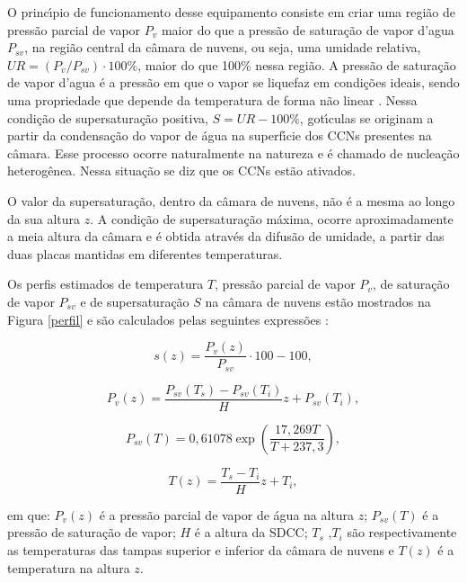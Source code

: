  O princ\'{\i}pio de funcionamento desse equipamento consiste em criar uma regi\~{a}o de press\~{a}o parcial de vapor $P_v$ maior do que a press\~{a}o de satura\c{c}\~{a}o de vapor d'agua $P_{sv}$, na regi\~{a}o central da c\^{a}mara de nuvens, ou seja, uma umidade relativa, $UR=(P_v/P_{sv}) \cdot 100\%$, maior do que 100\% nessa regi\~{a}o. A press\~{a}o de satura\c{c}\~{a}o de vapor d'agua \'{e} a press\~{a}o em que o vapor se liquefaz em condi\c{c}\~{o}es ideais, sendo uma propriedade que depende da temperatura de forma n\~{a}o linear \cite{wagner}. Nessa condi\c{c}\~{a}o de supersatura\c{c}\~{a}o positiva, $S=UR-100\%$, got\'{\i}culas se originam a partir da condensa\c{c}\~{a}o do vapor de \'{a}gua na superf\'{\i}cie dos CCNs presentes na c\^{a}mara. Esse processo ocorre naturalmente na natureza e \'{e} chamado de nuclea\c{c}\~{a}o heterog\^{e}nea. Nessa situa\c{c}\~{a}o se diz que os CCNs est\~{a}o ativados.

 O valor da supersatura\c{c}\~{a}o, dentro da c\^{a}mara de nuvens, n\~{a}o \'{e} a mesma ao longo da sua altura $z$. A condi\c{c}\~{a}o de supersatura\c{c}\~{a}o m\'{a}xima, ocorre aproximadamente a meia altura da c\^{a}mara e \'{e} obtida atrav\'{e}s da difus\~{a}o de umidade, a partir das duas placas mantidas em diferentes temperaturas.

Os perfis estimados de temperatura $T$, press\~{a}o parcial de vapor $P_v$, de satura\c{c}\~{a}o de vapor $P_{sv}$ e de supersatura\c{c}\~{a}o $S$ na c\^{a}mara de nuvens est\~{a}o mostrados na Figura \ref{perfil} e s\~{a}o calculados pelas seguintes express\~{o}es \cite{wagner,Frank}:


\begin{equation}
\label{eq01}
s(z)  = \frac{{P_v(z) }}{{P_{sv} }} \cdot 100 - 100,
\end{equation}

\begin{equation}
\label{eq02}
P_v(z)  = \frac{{P_{sv}(T_s )  - P_{sv}(T_i ) }}{H}z + P_{sv}(T_i ),
\end{equation}

\begin{equation}
\label{eq03}
P_{sv}(T)  = 0,61078\exp \left( {\frac{{17,269T}}{{T + 237,3}}} \right),
\end{equation}

\begin{equation}
\label{eq04}
T(z)  = \frac{{T_s  - T_i }}{H}z + T_i,
\end{equation}

\begin{flushleft} em que: $P_{v}(z)$ \'{e} a press\~{a}o parcial de vapor de \'{a}gua na altura $z$;
$P_{sv}(T)$ \'{e} a press\~{a}o de satura\c{c}\~{a}o de vapor;
$H$ \'{e} a altura da SDCC;
$T_{s}$ ,$T_{i}$  s\~{a}o respectivamente as temperaturas das tampas superior e inferior da c\^{a}mara de nuvens e
$T(z)$ \'{e} a temperatura na altura $z$.
\end{flushleft}

